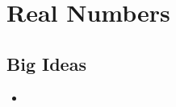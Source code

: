 \chapter{Real Numbers}
\label{chap:RN}

\section{Big Ideas}
\label{sec:RN Big Ideas}
\begin{itemize}
  \item 
\end{itemize}